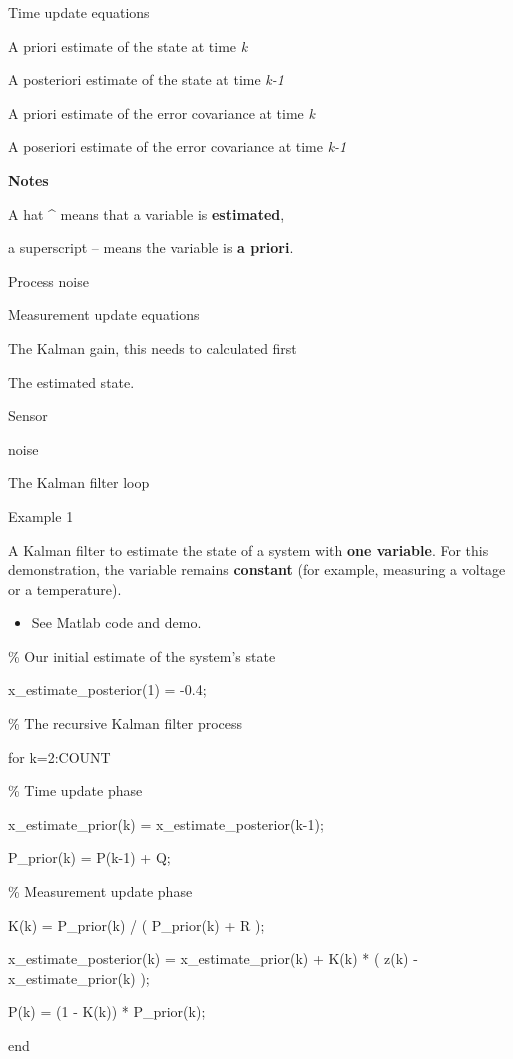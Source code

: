 \documentclass[compress]{beamer}
\providecommand{\tightlist}{%
  \setlength{\itemsep}{0pt}\setlength{\parskip}{0pt}}
\begin{document}
\begin{frame}{Time update equations}

A priori estimate of the state at time \emph{k}

A posteriori estimate of the state at time \emph{k-1}

A priori estimate of the error covariance at time \emph{k}

A poseriori estimate of the error covariance at time \emph{k-1}

\textbf{Notes}

A hat \^{} means that a variable is \textbf{estimated},

a superscript -- means the variable is \textbf{a priori}.

Process noise

\end{frame}

\begin{frame}{Measurement update equations}

The Kalman gain, this needs to calculated first

The estimated state.

Sensor

noise

\end{frame}

\begin{frame}{The Kalman filter loop}

\end{frame}

\begin{frame}{Example 1}

A Kalman filter to estimate the state of a system with \textbf{one
variable}. For this demonstration, the variable remains
\textbf{constant} (for example, measuring a voltage or a temperature).

\begin{itemize}
\tightlist
\item
  See Matlab code and demo.
\end{itemize}

\end{frame}

\begin{frame}{}

\% Our initial estimate of the system's state

x\_estimate\_posterior(1) = -0.4;

\% The recursive Kalman filter process

for k=2:COUNT

\% Time update phase

x\_estimate\_prior(k) = x\_estimate\_posterior(k-1);

P\_prior(k) = P(k-1) + Q;

\% Measurement update phase

K(k) = P\_prior(k) / ( P\_prior(k) + R );

x\_estimate\_posterior(k) = x\_estimate\_prior(k) + K(k) * ( z(k) -
x\_estimate\_prior(k) );

P(k) = (1 - K(k)) * P\_prior(k);

end

\end{frame}
\end{document}

